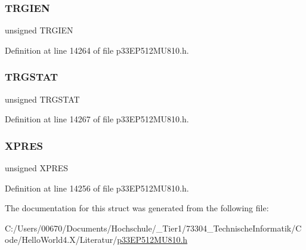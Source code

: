 \subsubsection{\texorpdfstring{T\+R\+G\+I\+EN}{TRGIEN}}
{\footnotesize\ttfamily unsigned T\+R\+G\+I\+EN}



Definition at line 14264 of file p33\+E\+P512\+M\+U810.\+h.

\mbox{\label{structtag_p_w_m_c_o_n2_b_i_t_s_a57c6135a12bae69a2a2cac5ed50a4a6d}} 
\subsubsection{\texorpdfstring{T\+R\+G\+S\+T\+AT}{TRGSTAT}}
{\footnotesize\ttfamily unsigned T\+R\+G\+S\+T\+AT}



Definition at line 14267 of file p33\+E\+P512\+M\+U810.\+h.

\mbox{\label{structtag_p_w_m_c_o_n2_b_i_t_s_a6a3f824223966417e0005dbe08b1833c}} 
\subsubsection{\texorpdfstring{X\+P\+R\+ES}{XPRES}}
{\footnotesize\ttfamily unsigned X\+P\+R\+ES}



Definition at line 14256 of file p33\+E\+P512\+M\+U810.\+h.



The documentation for this struct was generated from the following file\+:\begin{DoxyCompactItemize}
\item 
C\+:/\+Users/00670/\+Documents/\+Hochschule/\+\_\+\+Tier1/73304\+\_\+\+Technische\+Informatik/\+Code/\+Hello\+World4.\+X/\+Literatur/\hyperlink{p33_e_p512_m_u810_8h}{p33\+E\+P512\+M\+U810.\+h}\end{DoxyCompactItemize}
